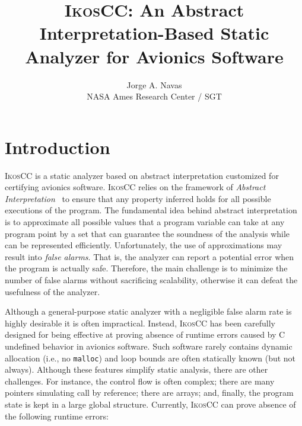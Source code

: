 \documentclass[a4]{article}
\newcommand{\ikoscc}{\textsc{IkosCC}\xspace}
\begin{document}
\title{\ikoscc: An Abstract Interpretation-Based Static Analyzer for Avionics Software}
\author{Jorge A. Navas \\ NASA Ames Research Center / SGT}

\maketitle

\normalem

\section{Introduction}
\label{sec:intro}

\ikoscc is a static analyzer based on abstract interpretation
customized for certifying avionics software.
%
\ikoscc relies on the framework of \emph{Abstract
  Interpretation}~\cite{intervals,Cousot_POPL77} to ensure that any
property inferred holds for all possible executions of the
program. The fundamental idea behind abstract interpretation is to
approximate all possible values that a program variable can take at
any program point by a set that can guarantee the soundness of the
analysis while can be represented efficiently. Unfortunately, the use
of approximations may result into \emph{false alarms}. That is, the
analyzer can report a potential error when the program is actually
safe. Therefore, the main challenge is to minimize the number of false
alarms without sacrificing scalability, otherwise it can defeat the
usefulness of the analyzer.

Although a general-purpose static analyzer with a negligible false
alarm rate is highly desirable it is often impractical. Instead,
\ikoscc has been carefully designed for being effective at proving
absence of runtime errors caused by C undefined behavior in avionics
software.
%
Such software rarely contains dynamic allocation (i.e., no
\texttt{malloc})  and loop bounds are often
statically known (but not always). Although these features simplify
static analysis, there are other challenges. For instance, the control
flow is often complex; there are many pointers simulating call by
reference; there are arrays; and, finally, the program state is kept
in a large global structure.
%
Currently, \ikoscc can prove absence of the following runtime errors:
\end{document}
